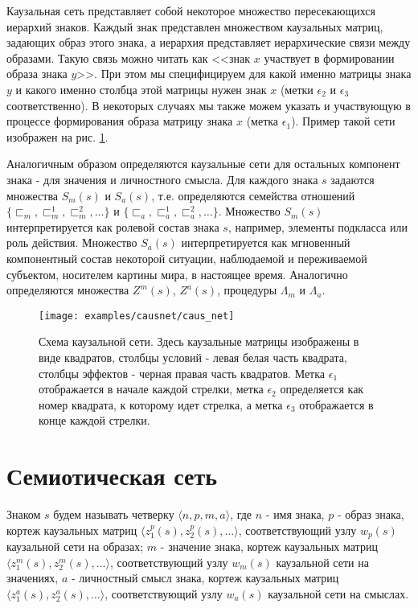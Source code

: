 \documentclass[12pt]{scrartcl}
\begin{document}
	Каузальная сеть представляет собой некоторое множество пересекающихся иерархий знаков. Каждый знак представлен множеством каузальных матриц, задающих образ этого знака, а иерархия представляет иерархические связи между образами. Такую связь можно читать как <<знак $x$ участвует в формировании образа знака $y$>>. При этом мы специфицируем для какой именно матрицы знака $y$ и какого именно столбца этой матрицы нужен знак $x$ (метки $\epsilon_2$ и $\epsilon_3$ соответственно). В некоторых случаях мы также можем указать и участвующую в процессе формирования образа матрицу знака $x$ (метка $\epsilon_1$). Пример такой сети изображен на рис. \ref{fig:caus_net}.
	
	Аналогичным образом определяются каузальные сети для остальных компонент знака - для значения и личностного смысла. Для каждого знака $s$ задаются множества $S_m(s)$ и $S_a(s)$, т.е. определяются семейства отношений $\{\sqsubset_m,\sqsubset_m^1,\sqsubset_m^2,\dots\}$ и $\{\sqsubset_a,\sqsubset_a^1,\sqsubset_a^2,\dots\}$. Множество $S_m(s)$ интерпретируется как ролевой состав знака $s$, например, элементы подкласса или роль действия. Множество $S_a(s)$ интерпретируется как мгновенный компонентный состав некоторой ситуации, наблюдаемой и переживаемой субъектом, носителем картины мира, в настоящее время. Аналогично определяются множества $Z^m(s)$, $Z^a(s)$, процедуры $\Lambda_m$ и $\Lambda_a$.
	
	\begin{figure}
		\centering
		\texttt{[image: examples/causnet/caus\_net]}
		\caption{Схема каузальной сети. Здесь каузальные матрицы изображены в виде квадратов, столбцы условий - левая белая часть квадрата, столбцы эффектов - черная правая часть квадратов. Метка $\epsilon_1$ отображается в начале каждой стрелки, метка $\epsilon_2$ определяется как номер квадрата, к которому идет стрелка, а метка $\epsilon_3$ отображается в конце каждой стрелки.}
		\label{fig:caus_net}		
	\end{figure}
	
	\section{Семиотическая сеть} \label{sec:semiotics}
	
	Знаком $s$ будем называть четверку $\langle n, p, m, a\rangle$, где $n$ - имя знака, $p$ - образ знака, кортеж каузальных матриц $\langle z_1^p(s), z_2^p(s), \dots\rangle$, соответствующий узлу $w_p(s)$ каузальной сети на образах;  $m$ - значение знака, кортеж каузальных матриц $\langle z_1^m(s), z_2^m(s), \dots\rangle$, соответствующий узлу $w_m(s)$ каузальной сети на значениях,  $a$ - личностный смысл знака, кортеж каузальных матриц $\langle z_1^a(s), z_2^a(s), \dots\rangle$, соответствующий узлу $w_a(s)$ каузальной сети на смыслах.
			
\end{document}
